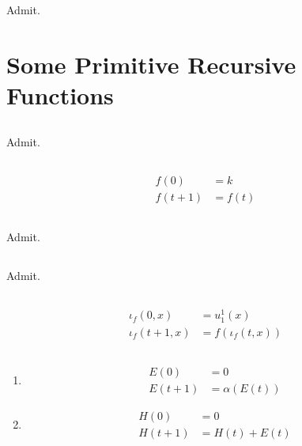 \subsection{}
Admit.



\section{Some Primitive Recursive Functions}

\subsection{}
Admit.

\subsection{}
\begin{align*}
  f(0)   & = k \\
  f(t+1) & = f(t)
\end{align*}


\subsection{}
Admit.

\subsection{}
Admit.


\subsection{}
\begin{align*}
  \iota_{f}(0, x)   & = u^{1}_{1}(x) \\
  \iota_{f}(t+1, x) & = f(\iota_{f}(t, x))
\end{align*}


\subsection{}
\begin{enumerate}
  \item
  \begin{align*}
    E(0)   & = 0 \\
    E(t+1) & = \alpha(E(t))
  \end{align*}

  \item
  \begin{align*}
    H(0)   & = 0 \\
    H(t+1) & = H(t) + E(t)
  \end{align*}
\end{enumerate}



